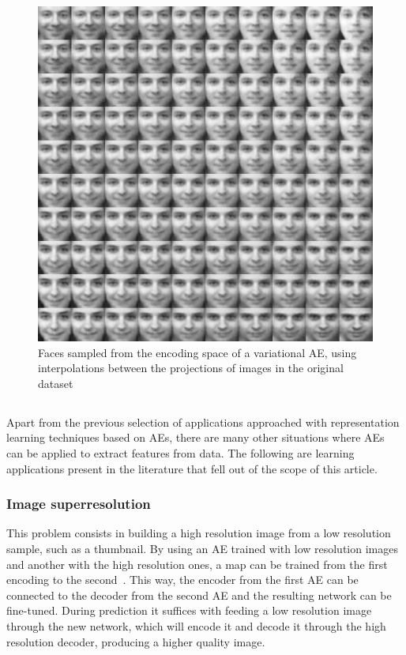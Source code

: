 \begin{figure}[ht!]
    \centering
    \includegraphics[width=\linewidth]{variational-matrix.png}
    \caption{\label{fig:sampledfaces}Faces sampled from the encoding space of a variational AE, using interpolations between the projections of images in the original dataset}
\end{figure}

\subsection{}\label{sec:oth}

Apart from the previous selection of applications approached with representation learning techniques based on AEs, there are many other situations where AEs can be applied to extract features from data. The following are learning applications present in the literature that fell out of the scope of this article.

\subsubsection{Image superresolution} This problem consists in building a high resolution image from a low resolution sample, such as a thumbnail. By using an AE trained with low resolution images and another with the high resolution ones, a map can be trained from the first encoding to the second~. This way, the encoder from the first AE can be connected to the decoder from the second AE and the resulting network can be fine-tuned. During prediction it suffices with feeding a low resolution image through the new network, which will encode it and decode it through the high resolution decoder, producing a higher quality image.

